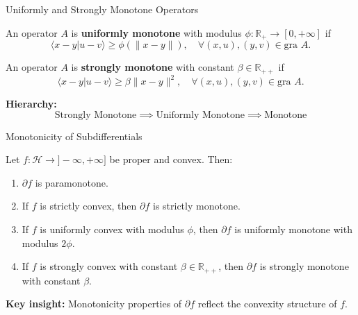\documentclass[aspectratio=169,10pt]{beamer}
\begin{document}
\begin{frame}{Uniformly and Strongly Monotone Operators}
    \begin{definition}
        An operator $A$ is \textbf{uniformly monotone} with modulus $\phi: \mathbb{R}_+ \to [0, +\infty]$ if
        $$\langle x - y | u - v \rangle \geq \phi(\|x - y\|), \quad \forall (x,u), (y,v) \in \text{gra } A.$$
    \end{definition}

    \begin{definition}
        An operator $A$ is \textbf{strongly monotone} with constant $\beta \in \mathbb{R}_{++}$ if
        $$\langle x - y | u - v \rangle \geq \beta \|x - y\|^2, \quad \forall (x,u), (y,v) \in \text{gra } A.$$
    \end{definition}

    \vspace{0.5cm}
    \textbf{Hierarchy:}
    $$\text{Strongly Monotone} \implies \text{Uniformly Monotone} \implies \text{Monotone}$$
\end{frame}

\begin{frame}{Monotonicity of Subdifferentials}
    \begin{example}[22.4]
        Let $f: \mathcal{H} \to ]-\infty, +\infty]$ be proper and convex. Then:
        \begin{enumerate}
            \item[(i)] $\partial f$ is paramonotone.
            \item[(ii)] If $f$ is strictly convex, then $\partial f$ is strictly monotone.
            \item[(iii)] If $f$ is uniformly convex with modulus $\phi$, then $\partial f$ is uniformly monotone
                       with modulus $2\phi$.
            \item[(iv)] If $f$ is strongly convex with constant $\beta \in \mathbb{R}_{++}$, then $\partial f$ is
                       strongly monotone with constant $\beta$.
        \end{enumerate}
    \end{example}

    \vspace{0.5cm}
    \textbf{Key insight:} Monotonicity properties of $\partial f$ reflect the convexity structure of $f$.
\end{frame}
\end{document}
